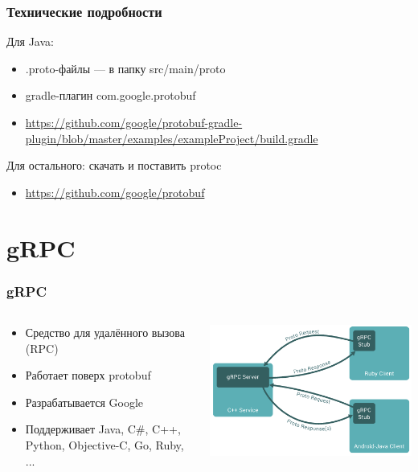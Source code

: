 \documentclass[xetex,mathserif,serif]{beamer}
\begin{document}
    \begin{frame}
        \frametitle{Технические подробности}
        Для Java:
        \begin{itemize}
            \item .proto-файлы --- в папку src/main/proto
            \item gradle-плагин com.google.protobuf
            \item \url{https://github.com/google/protobuf-gradle-plugin/blob/master/examples/exampleProject/build.gradle}
        \end{itemize}
        Для остального: скачать и поставить protoc
        \begin{itemize}
            \item \url{https://github.com/google/protobuf}
        \end{itemize}
    \end{frame}

    \section{gRPC}

    \begin{frame}
        \frametitle{gRPC}
        \begin{columns}
            \begin{column}{0.6\textwidth}
                \begin{itemize}
                    \item Средство для удалённого вызова (RPC)
                    \item Работает поверх protobuf
                    \item Разрабатывается Google
                    \item Поддерживает Java, C\#, C++, Python,  Objective-C, Go, Ruby, ...
                \end{itemize}
            \end{column}
            \begin{column}{0.4\textwidth}
                \begin{center}
                    \includegraphics[width=\textwidth]{grpc.png}
                \end{center}
            \end{column}
        \end{columns}
    \end{frame}
\end{document}
